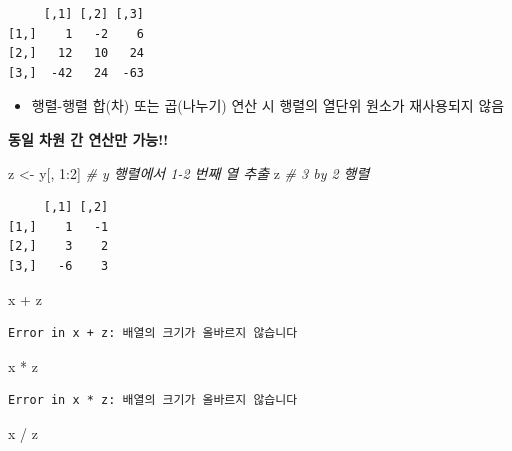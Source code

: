 \documentclass[
  11pt,
]{krantz}
\makeatletter
\newenvironment{Shaded}{\begin{snugshade}}{\end{snugshade}}
\newcommand{\CommentTok}[1]{\textcolor[rgb]{0.37,0.37,0.37}{\textit{#1}}}
\newcommand{\DecValTok}[1]{\textcolor[rgb]{0.06,0.06,0.06}{#1}}
\newcommand{\NormalTok}[1]{#1}
\newcommand{\OtherTok}[1]{\textcolor[rgb]{0.37,0.37,0.37}{#1}}
\newcommand{\SpecialCharTok}[1]{\textcolor[rgb]{0,0,0}{#1}}
\providecommand{\tightlist}{%
  \setlength{\itemsep}{0pt}\setlength{\parskip}{0pt}}
\newenvironment{kframe}{%
\medskip{}
\setlength{\fboxsep}{.8em}
 \def\at@end@of@kframe{}%
 \ifinner\ifhmode%
  \def\at@end@of@kframe{\end{minipage}}%
  \begin{minipage}{\columnwidth}%
 \fi\fi%
 \def\FrameCommand##1{\hskip\@totalleftmargin \hskip-\fboxsep
 \colorbox{shadecolor}{##1}\hskip-\fboxsep
     \hskip-\linewidth \hskip-\@totalleftmargin \hskip\columnwidth}%
 \MakeFramed {\advance\hsize-\width
   \@totalleftmargin\z@ \linewidth\hsize
   \@setminipage}}%
 {\par\unskip\endMakeFramed%
 \at@end@of@kframe}
\renewenvironment{quote}{\begin{kframe}}{\end{kframe}}
\makeatother
\begin{document}
\begin{verbatim}
     [,1] [,2] [,3]
[1,]    1   -2    6
[2,]   12   10   24
[3,]  -42   24  -63
\end{verbatim}

\normalsize

\begin{itemize}
\tightlist
\item
  행렬-행렬 합(차) 또는 곱(나누기) 연산 시 행렬의 열단위 원소가 재사용되지 않음
\end{itemize}

\begin{quote}
\textbf{동일 차원 간 연산만 가능!!}
\end{quote}

\footnotesize

\begin{Shaded}
\begin{Highlighting}[]
\NormalTok{z }\OtherTok{\textless{}{-}}\NormalTok{ y[, }\DecValTok{1}\SpecialCharTok{:}\DecValTok{2}\NormalTok{] }\CommentTok{\# y 행렬에서 1{-}2 번째 열 추출}
\NormalTok{z }\CommentTok{\# 3 by 2 행렬}
\end{Highlighting}
\end{Shaded}

\begin{verbatim}
     [,1] [,2]
[1,]    1   -1
[2,]    3    2
[3,]   -6    3
\end{verbatim}

\begin{Shaded}
\begin{Highlighting}[]
\NormalTok{x }\SpecialCharTok{+}\NormalTok{ z}
\end{Highlighting}
\end{Shaded}

\begin{verbatim}
Error in x + z: 배열의 크기가 올바르지 않습니다
\end{verbatim}

\begin{Shaded}
\begin{Highlighting}[]
\NormalTok{x }\SpecialCharTok{*}\NormalTok{ z}
\end{Highlighting}
\end{Shaded}

\begin{verbatim}
Error in x * z: 배열의 크기가 올바르지 않습니다
\end{verbatim}

\begin{Shaded}
\begin{Highlighting}[]
\NormalTok{x }\SpecialCharTok{/}\NormalTok{ z}
\end{Highlighting}
\end{Shaded}
\end{document}
